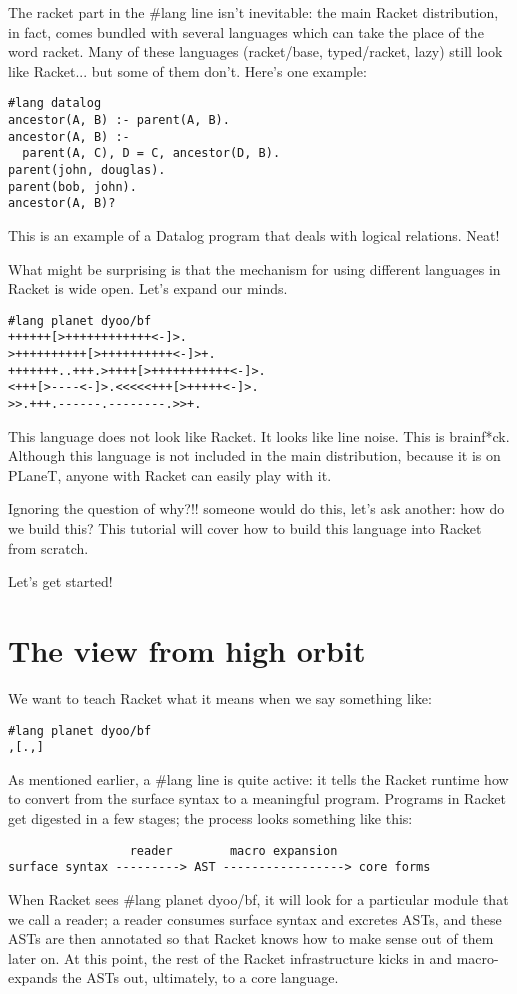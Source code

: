 \documentclass{article}
\begin{document}
The racket part in the #lang line isn’t inevitable: the main Racket distribution, in fact, comes bundled with several languages which can take the place of the word racket. Many of these languages (racket/base, typed/racket, lazy) still look like Racket... but some of them don’t. Here’s one example:
\begin{verbatim}
#lang datalog
ancestor(A, B) :- parent(A, B).
ancestor(A, B) :-
  parent(A, C), D = C, ancestor(D, B).
parent(john, douglas).
parent(bob, john).
ancestor(A, B)?
\end{verbatim}
This is an example of a Datalog program that deals with logical relations. Neat!


What might be surprising is that the mechanism for using different languages in Racket is wide open. Let’s expand our minds.
\begin{verbatim}
#lang planet dyoo/bf
++++++[>++++++++++++<-]>.
>++++++++++[>++++++++++<-]>+.
+++++++..+++.>++++[>+++++++++++<-]>.
<+++[>----<-]>.<<<<<+++[>+++++<-]>.
>>.+++.------.--------.>>+.
\end{verbatim}
This language does not look like Racket. It looks like line noise. This is brainf*ck. Although this language is not included in the main distribution, because it is on PLaneT, anyone with Racket can easily play with it.


Ignoring the question of why?!! someone would do this, let’s ask another: how do we build this? This tutorial will cover how to build this language into Racket from scratch.

Let’s get started!

\section{The view from high orbit}
We want to teach Racket what it means when we say something like:
\begin{verbatim}
#lang planet dyoo/bf
,[.,]
\end{verbatim}
As mentioned earlier, a #lang line is quite active: it tells the Racket runtime how to convert from the surface syntax to a meaningful program. Programs in Racket get digested in a few stages; the process looks something like this:

\begin{verbatim}
                 reader        macro expansion
surface syntax ---------> AST -----------------> core forms
\end{verbatim}

When Racket sees #lang planet dyoo/bf, it will look for a particular module that we call a reader; a reader consumes surface syntax and excretes ASTs, and these ASTs are then annotated so that Racket knows how to make sense out of them later on. At this point, the rest of the Racket infrastructure kicks in and macro-expands the ASTs out, ultimately, to a core language.
\end{document}

